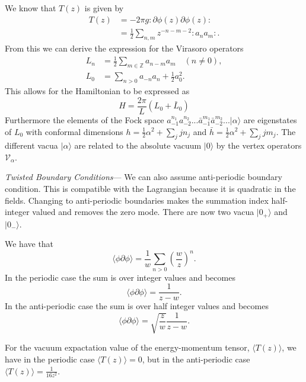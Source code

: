 \documentclass[submission, PhysLectNotes]{SciPost}
\begin{document}
We know that $T(z)$ is given by
\begin{align}
  T(z) &= -2\pi g :\partial \phi(z) \partial\phi(z) :\\
  &= \frac{1}{2} \sum_{n,m}z^{-n-m-2}:a_na_m: .
\end{align}
From this we can derive the expression for the Virasoro operators
\begin{align}
  L_n &= \frac{1}{2}\sum_{m\in\mathbb{Z}}a_{n-m}a_m \quad(n\neq 0),\\
  L_0 &= \sum_{n>0}a_{-n}a_n + \frac{1}{2}a_0^2.
\end{align}
This allows for the Hamiltonian to be expressed as
\begin{equation}
  H = \frac{2\pi}{L}(L_0+\bar{L}_0)
\end{equation}
Furthermore the elements of the Fock space $a_{-1}^{n_1}a_{-2}^{n_2}...\bar{a}_{-1}^{m_1}\bar{a}_{-2}^{m_2}...\lvert\alpha\rangle$ are eigenstates of $L_0$ with conformal dimensions $h=\frac{1}{2}\alpha^2+\sum_jjn_j$ and $\bar{h}=\frac{1}{2}\alpha^2+\sum_jjm_j$.
The different vacua $\lvert \alpha\rangle$ are related to the absolute vacuum $\lvert 0\rangle$ by the vertex operators $\mathcal{V}_\alpha$.

{\it Twisted Boundary Conditions}---
We can also assume anti-periodic boundary condition. This is compatible with the Lagrangian because it is quadratic in the fields. Changing to anti-periodic boundaries makes the summation index half-integer valued and removes the zero mode. There are now two vacua $\lvert 0_+ \rangle$ and $\lvert 0_- \rangle$.

We have that
\begin{equation}
    \langle\phi\partial\phi\rangle = \frac{1}{w}\sum_{n>0}\left(\frac{w}{z}\right)^n.
\end{equation}
In the periodic case the sum is over integer values and becomes
\begin{equation}
  \langle\phi\partial\phi\rangle = \frac{1}{z-w}.
\end{equation}
In the anti-periodic case the sum is over half integer values and becomes
\begin{equation}
  \langle\phi\partial\phi\rangle = \sqrt{\frac{z}{w}}\frac{1}{z-w}.
\end{equation}

For the vacuum expactation value of the energy-momentum tensor, $\langle T(z)\rangle$, we have in the periodic case $\langle T(z)\rangle = 0$, but in the anti-periodic case $\langle T(z)\rangle=\frac{1}{16z^2}$.
\end{document}
